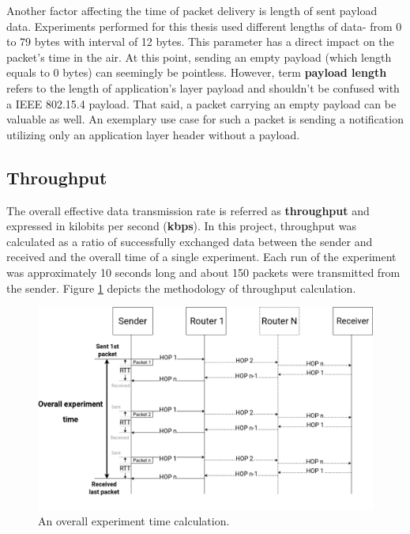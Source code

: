 Another factor affecting the time of packet delivery is length of sent payload data. 
Experiments performed for this thesis used different lengths of data- from 0 to 79 
bytes with interval of 12 bytes. This parameter has a direct impact on the packet's 
time in the air. At this point, sending an empty payload (which length equals to 0 
bytes) can seemingly be pointless. However, term \textbf{payload length} refers to the
length of application's layer payload and shouldn't be confused with a IEEE 802.15.4 
payload. That said, a packet carrying an empty payload can be valuable as well. An 
exemplary use case for such a packet is sending a notification utilizing only an 
application layer header without a payload.


\subsection*{Throughput}

The overall effective data transmission rate is referred as \textbf{throughput} and expressed in kilobits per second (\textbf{kbps}). In this project, throughput was calculated as a ratio of successfully exchanged data between the sender and received and the overall time of a single experiment. Each run of the experiment
was approximately 10 seconds long and about 150 packets were transmitted from the sender. Figure \ref{fig:throughput} depicts the methodology of throughput calculation.

\begin{figure}[H]
    \centering
    \includegraphics[scale=0.35]{images/throughput-diagram.drawio.png}
    \caption{An overall experiment time calculation.}
    \label{fig:throughput}
\end{figure}

